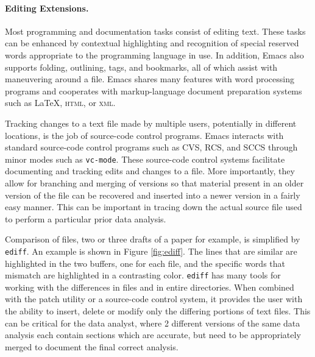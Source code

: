 \documentclass{article}
\newcommand{\stexttt}[1]{{\small\texttt{#1}}}
\begin{document}


\paragraph{Editing Extensions.}
Most programming and documentation tasks consist of editing text.
These tasks can be enhanced by contextual highlighting and recognition
of special reserved words appropriate to the programming language in
use.  In addition, Emacs also supports folding, outlining, tags, and
bookmarks, all of which assist with maneuvering around a file.  Emacs
shares many features with word processing programs and cooperates with
markup-language document preparation systems such as \LaTeX,
\textsc{html}, or \textsc{xml}.

Tracking changes to a text file made by multiple users, potentially in
different locations, is the job of source-code control programs.
Emacs interacts with standard source-code control programs such as
CVS, RCS, and SCCS through minor modes such as \stexttt{vc-mode}.
These source-code control systems facilitate documenting and tracking
edits and changes to a file.  More importantly, they allow for
branching and merging of versions so that material present in an older
version of the file can be recovered and inserted into a newer version
in a fairly easy manner.  This can be important in tracing down the
actual source file used to perform a particular prior data analysis.

Comparison of files, two or three drafts of a paper for example, is
simplified by \stexttt{ediff}.  An example is shown in Figure
\ref{fig:ediff}.  The lines that are similar are highlighted in the two
buffers, one for each file, and the specific words that mismatch are
highlighted in a contrasting color.  \stexttt{ediff} has many tools
for working with the differences in files and in entire directories.
When combined with the patch utility or a source-code control system,
it provides the user with the ability to insert, delete or modify only
the differing portions of text files.  This can be critical for the
data analyst, where 2 different versions of the same data analysis
each contain sections which are accurate, but need to be appropriately
merged to document the final correct analysis.
\end{document}
